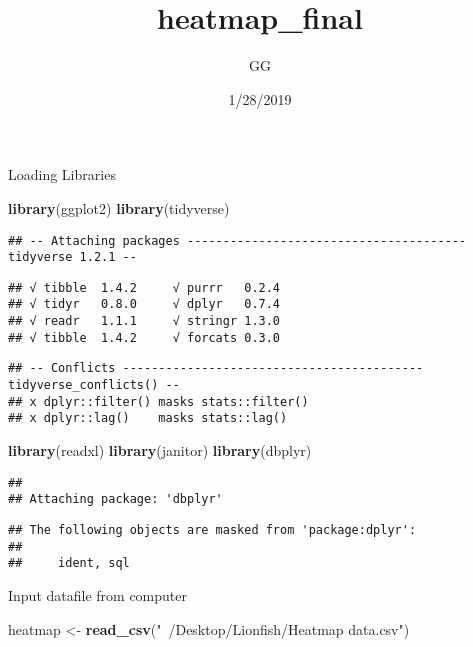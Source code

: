 \documentclass[]{article}
\title{heatmap\_final}
\author{GG}
\date{1/28/2019}
\newenvironment{Shaded}{\begin{snugshade}}{\end{snugshade}}
\newcommand{\KeywordTok}[1]{\textcolor[rgb]{0.13,0.29,0.53}{\textbf{#1}}}
\newcommand{\StringTok}[1]{\textcolor[rgb]{0.31,0.60,0.02}{#1}}
\newcommand{\NormalTok}[1]{#1}
\begin{document}
\maketitle

Loading Libraries

\begin{Shaded}
\begin{Highlighting}[]
\KeywordTok{library}\NormalTok{(ggplot2)}
\KeywordTok{library}\NormalTok{(tidyverse)}
\end{Highlighting}
\end{Shaded}

\begin{verbatim}
## -- Attaching packages --------------------------------------- tidyverse 1.2.1 --
\end{verbatim}

\begin{verbatim}
## √ tibble  1.4.2     √ purrr   0.2.4
## √ tidyr   0.8.0     √ dplyr   0.7.4
## √ readr   1.1.1     √ stringr 1.3.0
## √ tibble  1.4.2     √ forcats 0.3.0
\end{verbatim}

\begin{verbatim}
## -- Conflicts ------------------------------------------ tidyverse_conflicts() --
## x dplyr::filter() masks stats::filter()
## x dplyr::lag()    masks stats::lag()
\end{verbatim}

\begin{Shaded}
\begin{Highlighting}[]
\KeywordTok{library}\NormalTok{(readxl)}
\KeywordTok{library}\NormalTok{(janitor)}
\KeywordTok{library}\NormalTok{(dbplyr)}
\end{Highlighting}
\end{Shaded}

\begin{verbatim}
## 
## Attaching package: 'dbplyr'
\end{verbatim}

\begin{verbatim}
## The following objects are masked from 'package:dplyr':
## 
##     ident, sql
\end{verbatim}

Input datafile from computer

\begin{Shaded}
\begin{Highlighting}[]
\NormalTok{heatmap <-}\StringTok{ }\KeywordTok{read_csv}\NormalTok{(}\StringTok{"~/Desktop/Lionfish/Heatmap data.csv"}\NormalTok{)}
\end{Highlighting}
\end{Shaded}
\end{document}
